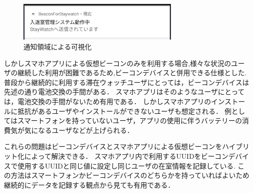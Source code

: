 \begin{figure}[tbh]
  \centering
  \includegraphics[width=8cm]{image/notify.jpg}
  \caption{通知領域による可視化}
  \label{multipleBPM}
\end{figure}
 しかしスマホアプリによる仮想ビーコンのみを利用する場合,様々な状況のユーザの継続した利用が困難であるため,ビーコンデバイスと併用できる仕様とした.
 普段から継続的に利用する滞在ウォッチユーザにとっては，ビーコンデバイスは先述の通り電池交換の手間がある．
スマホアプリはそのようなユーザにとっては，電池交換の手間がないため有用である．
 しかしスマホアプリのインストールに抵抗があるユーザやインストールができないユーザも想定される．
例としてはスマートフォンを持っていないユーザ，アプリの使用に伴うバッテリーの消費気が気になるユーザなどが上げられる．

 これらの問題はビーコンデバイスとスマホアプリによる仮想ビーコンをハイブリット化によって解決できる．
スマホアプリ内で利用するUUIDをビーコンデバイスで使用するUUIDと同じ値に設定し同じユーザの在室情報を記録している.
この方法はスマートフォンかビーコンデバイスのどちらかを持っていればよいため継続的にデータを記録する観点から見ても有用である．













